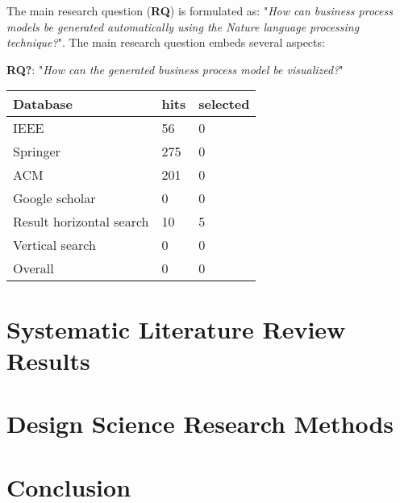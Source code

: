 \documentclass[runningheads]{llncs}
\begin{document}
	The main research question (\textbf{RQ}) is formulated as: "\textit{How can business process models be generated automatically using the Nature language processing technique?}". The main research question embeds several aspects: 
	

 		 \textbf{RQ?}: "\textit{How can the generated business process model be visualized?}"
	
	\begin{table}[]
	\centering
	\begin{tabular}{lll}
    \textbf{Database}\hspace{50mm} & \textbf{hits} \hspace{10mm} & \textbf{selected} \\
    \hline
	IEEE                     & 56   & 0        \\
	Springer                 & 275  & 0        \\
	ACM                      & 201  & 0        \\
	Google scholar           & 0    & 0        \\
	\hline
	Result horizontal search	 & 10   & 5        \\
	Vertical search          & 0    & 0        \\
	\hline
	Overall                  & 0    & 0       
	\end{tabular}
	\end{table}
	
		
	\section{Systematic Literature Review Results}		
		
	\section{Design Science Research Methods}
	
	\section{Conclusion}
		
\end{document}
